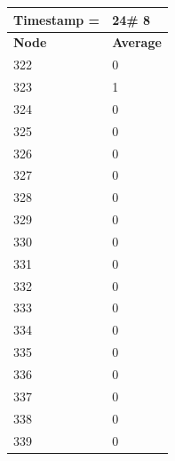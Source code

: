 \begin{tabular}{|l||l|}
\hline
\textbf{Timestamp =} & \textbf{24}\# 8\\\hline
	\textbf{Node} & \textbf{Average} \\ \hline
\hline
	322 & 0 \\ \hline
	323 & 1 \\ \hline
	324 & 0 \\ \hline
	325 & 0 \\ \hline
	326 & 0 \\ \hline
	327 & 0 \\ \hline
	328 & 0 \\ \hline
	329 & 0 \\ \hline
	330 & 0 \\ \hline
	331 & 0 \\ \hline
	332 & 0 \\ \hline
	333 & 0 \\ \hline
	334 & 0 \\ \hline
	335 & 0 \\ \hline
	336 & 0 \\ \hline
	337 & 0 \\ \hline
	338 & 0 \\ \hline
	339 & 0 \\ \hline
\end{tabular}

